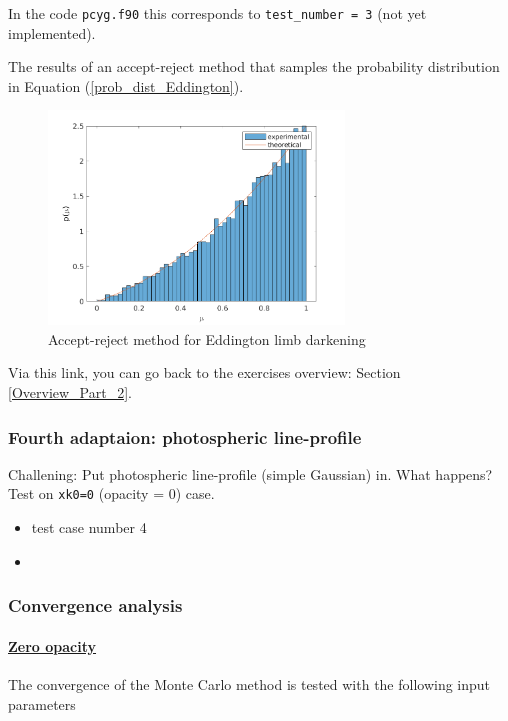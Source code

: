 \documentclass[../main/main.tex]{subfiles}
\begin{document}
\begin{enumerate}
In the code \texttt{pcyg.f90} this corresponds to \texttt{test\_number = 3} (not yet implemented). 

The results of an accept-reject method that samples the probability distribution in Equation (\ref{prob_dist_Eddington}).

\begin{figure}[!htp]
\centering
\includegraphics[width=0.7\textwidth]{../../introductory_exercises/P_Cygni_profile_UV_resonance/data/Eddington_accept_reject.png}
\caption{Accept-reject method for Eddington limb darkening}
\end{figure}

\end{enumerate}

Via this link, you can go back to the exercises overview: Section \underline{\ref{Overview_Part_2}}.

\newpage
\subsubsection{Fourth adaptaion: photospheric line-profile}
Challening: Put photospheric line-profile (simple Gaussian) in. What happens? Test on \texttt{xk0=0} (opacity = 0) case.

\begin{itemize}
\item test case number 4 
\item \noindent{}
\end{itemize}

\newpage
\subsubsection{Convergence analysis}
\label{convergence_analysis}

\paragraph{\underline{Zero opacity}}
The convergence of the Monte Carlo method is tested with the following input parameters
\end{document}
